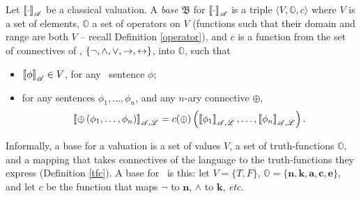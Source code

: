 \begin{definition}[Base] \citep[27]{bevpospa}
Let $\left\llbracket \cdot\right\rrbracket_{\mathscr{A}}$ be a classical valuation. A \emph{base} $\mathfrak{B}$ for $\left\llbracket \cdot\right\rrbracket_{\mathscr{A}}$ is a triple $\langle V, \mathbb{O}, c\rangle$ where $V$ is a set of elements, $\mathbb{O}$ a set of operators on $V$ (functions such that their domain and range are both $V$ – recall Definition \ref{operator}), and $c$ is a function from the set of connectives of \lone, $\{\neg,\wedge,\vee,\to,\leftrightarrow\}$, into $\mathbb{O}$, such that \begin{itemize}
	\item $\left\llbracket \phi\right\rrbracket_{\mathscr{A}} \in V$, for any \lone\ sentence $\phi$;
	\item for any sentences $\phi_{1},\ldots,\phi_{n}$, and any $n$-ary connective $\oplus$, $$\left\llbracket \oplus\left(\phi_{1},\ldots,\phi_{n}\right)\right\rrbracket_{\mathscr{A,L}} = c(\oplus)\left(\left\llbracket \phi_{1}\right\rrbracket_{\mathscr{A,L}},\ldots,\left\llbracket \phi_{n}\right\rrbracket_{\mathscr{A,L}}\right).$$
\end{itemize} 
\end{definition}
Informally, a base for a valuation is a set of values $V$, a set of truth-functions $\mathbb{O}$, and a mapping that takes connectives of the language to the truth-functions they express (Definition \ref{tfc}). A base for \lone\ is this: let $V = \{T,F\}$, $\mathbb{O} = \{\mathbf{n},\mathbf{k},\mathbf{a},\mathbf{c},\mathbf{e}\}$, and let $c$ be the function that maps $\neg$ to $\mathbf{n}$, $\wedge$ to $\mathbf{k}$, \emph{etc}.




